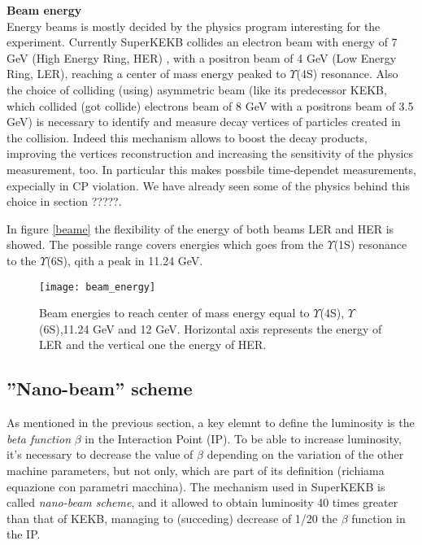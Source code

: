 \textbf{Beam energy}\\


Energy beams is mostly decided by the physics program interesting for the experiment. Currently SuperKEKB collides an electron beam with energy of 7 GeV (High Energy Ring, HER) , with a positron beam of 4 GeV (Low Energy Ring, LER), reaching a center of mass energy peaked to $\Upsilon$(4S) resonance.
Also the choice of colliding (using) asymmetric beam (like its predecessor KEKB, which collided (got collide) electrons beam of 8 GeV with a positrons beam of 3.5 GeV) is necessary to identify and measure decay vertices of particles created in the collision. Indeed this mechanism allows to boost the decay products, improving the vertices reconstruction and increasing the sensitivity of the physics measurement, too. In particular this makes possbile time-dependet measurements, expecially in CP violation. We have already seen some of the physics behind this choice in section ?????.


In figure \vref{beame} the flexibility of the energy of both beams LER and HER is showed. The possible range covers energies which goes from the $\Upsilon$(1S) resonance to the $\Upsilon$(6S), qith a peak in 11.24 GeV.

\begin{figure}
\centering
\texttt{[image: beam\_energy]}
\caption{Beam energies to reach center of mass energy equal to $\Upsilon$(4S), $\Upsilon$(6S),11.24 GeV and 12 GeV. Horizontal axis represents the energy of LER and the vertical one the energy of HER. }
\label{fig:beame}
\end{figure}


\subsection{''Nano-beam'' scheme}

As mentioned in the previous section, a key elemnt to define the luminosity is the \textit{beta function} $\beta$ in the Interaction Point (IP). To be able to increase luminosity, it's necessary to decrease the value of $\beta$ depending on the variation of the other machine parameters, but not only, which are part of its definition (richiama equazione con parametri macchina).
The mechanism used in SuperKEKB is called \textit{nano-beam scheme}, and it allowed to obtain luminosity 40 times greater than that of KEKB, managing to (succeding) decrease of 1/20 the $\beta$ function in the IP.

